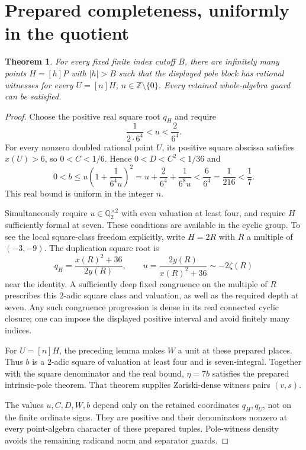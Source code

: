 \documentclass[11pt]{article}
\newtheorem{theorem}{Theorem}\newtheorem{lemma}{Lemma}
\newcommand{\Q}{\mathbb Q}\newcommand{\Z}{\mathbb Z}
\begin{document}
\section{Prepared completeness, uniformly in the quotient}

\begin{theorem}
For every fixed finite index cutoff $B$, there are infinitely many
points $H=[h]P$ with $|h|>B$ such that the displayed pole block
has rational witnesses for every $U=[n]H$, $n\in\Z\setminus\{0\}$.
Every retained whole-algebra guard can be satisfied.
\end{theorem}
\begin{proof}
Choose the positive real square root $q_H$ and require
\[
              \frac1{2\cdot6^4}<u<\frac2{6^4}.
\]
For every nonzero doubled rational point $U$, its positive square
abscissa satisfies $x(U)>6$, so $0<C<1/6$. Hence
$0<D<C^2<1/36$ and
\[
 0<b\le u\left(1+\frac1{6^4u}\right)^2
       =u+\frac2{6^4}+\frac1{6^8u}
       <\frac6{6^4}=\frac1{216}<\frac17.
\]
This real bound is uniform in the integer $n$.

Simultaneously require $u\in\Q_2^{\times2}$ with even valuation
at least four, and require $H$ sufficiently formal at seven.
These conditions are available in the cyclic group. To see the local
square-class freedom explicitly, write $H=2R$ with $R$ a multiple
of $(-3,-9)$. The duplication square root is
\[
 q_H=\frac{x(R)^2+36}{2y(R)},\qquad
 u=\frac{2y(R)}{x(R)^2+36}\sim-2\zeta(R)
\]
near the identity. A sufficiently deep fixed congruence on the
multiple of $R$ prescribes this $2$-adic square class and valuation,
as well as the required depth at seven. Any such congruence progression
is dense in its real connected cyclic closure; one can impose the
displayed positive interval and avoid finitely many indices.

For $U=[n]H$, the preceding lemma makes $W$ a unit at these prepared
places. Thus $b$ is a $2$-adic square of valuation at least four and
is seven-integral. Together with the square denominator and the real
bound, $\eta=7b$ satisfies the prepared intrinsic-pole theorem.
That theorem supplies Zariski-dense witness pairs $(v,s)$.

The values $u,C,D,W,b$ depend only on the retained coordinates
$q_H,q_U$, not on the finite ordinate signs. They are positive and
their denominators nonzero at every point-algebra character of these
prepared tuples. Pole-witness density avoids the remaining radicand
norm and separator guards.
\end{proof}
\end{document}
